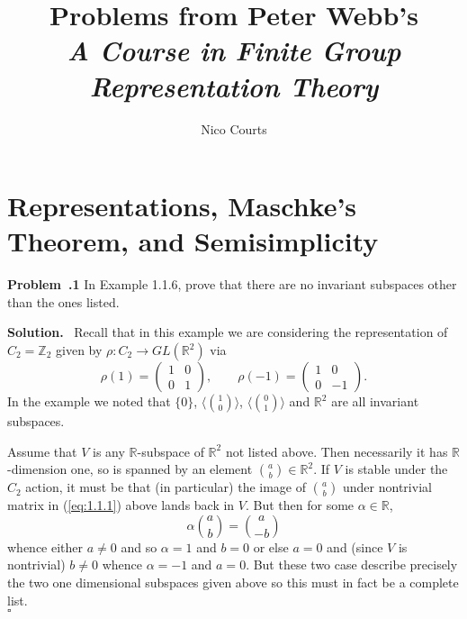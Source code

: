 \documentclass[12pt]{article}
\newcommand*{\Z}{
\mathbb{Z}
}
\newcommand*{\R}{
\mathbb{R}
}
\newenvironment{prob}[1]{\par\smallskip
	\noindent\begin{mdframed}\small \textbf{Problem~\thesection.#1} \rmfamily\quad}{\end{mdframed}\medskip}
\newenvironment{sol}{\noindent \textbf{Solution.} \,}{\\\hspace*{\fill}$\square$\medskip}
\begin{document}
\title{ Problems from Peter Webb's\\ \textit{A Course in Finite Group Representation Theory}\vspace{-1ex}}
\author{Nico Courts}
\date{}
\maketitle


\section{Representations, Maschke's Theorem, and Semisimplicity}
\begin{prob}{1}
	In Example 1.1.6, prove that there are no invariant subspaces other than the ones listed.
\end{prob}

\begin{sol}
	Recall that in this example we are considering the representation of $C_2=\Z_2$ given by $\rho:C_2\to GL(\R^2)$ via
	\[\rho(1)=\begin{pmatrix}
	1 & 0\\ 0 & 1
	\end{pmatrix},\qquad \rho(-1)=\begin{pmatrix}
	1 & 0\\ 0 & -1
	\end{pmatrix}\tag{1}\label{eq:1.1.1}.\]
	In the example we noted that $\{0\}$, $\langle\binom{1}{0}\rangle$, $\langle\binom{0}{1}\rangle$ and $\R^2$ are all invariant subspaces.
	
	Assume that $V$ is any $\R$-subspace of $\R^2$ not listed above. Then necessarily it has $\R$-dimension one, so is spanned by an element $\binom{a}{b}\in\R^2.$ If $V$ is stable under the $C_2$ action, it must be that (in particular) the image of $\binom{a}{b}$ under nontrivial matrix in (\ref{eq:1.1.1}) above lands back in $V$. But then for some $\alpha\in\R$,
	\[\alpha\binom{a}{b}=\binom{a}{-b}\]
	whence either $a\ne 0$ and so $\alpha=1$ and $b=0$ or else $a=0$ and (since $V$ is nontrivial) $b\ne 0$ whence $\alpha=-1$ and $a=0$. But these two case describe precisely the two one dimensional subspaces given above so this must in fact be a complete list.
\end{sol}
\end{document}
